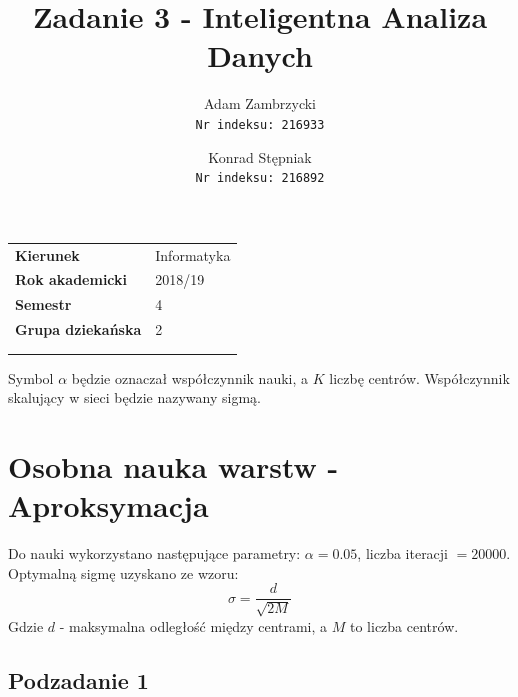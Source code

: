 \documentclass[a4paper, portrait,11pt]{article}
\title{\textbf{Zadanie 3 - Inteligentna Analiza Danych}}
\author{
  Adam Zambrzycki\\
  \texttt{Nr indeksu: 216933}
  \and
  Konrad Stępniak\\
  \texttt{Nr indeksu: 216892}
}
\begin{document}
\maketitle
  \begin{tabular}{ll}
    \textbf{Kierunek} & Informatyka\\
    \textbf{Rok akademicki} & {2018/19} \\
    \textbf{Semestr} & {4} \\
    \textbf{Grupa dziekańska}& {2} \\ \\ \\
  \end{tabular}

Symbol $\alpha$ będzie oznaczał współczynnik nauki, a $K$ liczbę centrów.
Współczynnik skalujący w sieci będzie nazywany sigmą.

\section{Osobna nauka warstw - Aproksymacja}
Do nauki wykorzystano następujące parametry: $\alpha=0.05$, liczba iteracji $= 20000$.
Optymalną sigmę uzyskano ze wzoru:
\begin{equation}
  \sigma = \frac{d}{\sqrt{2M}}
\end{equation}
Gdzie $d$ - maksymalna odległość między centrami, a $M$ to liczba centrów.
\subsection{Podzadanie 1}
\end{document}

